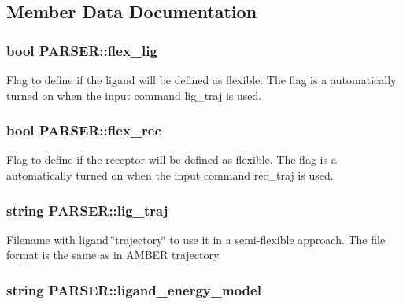 \subsection{Member Data Documentation}
\hypertarget{classPARSER_a974c6bc2d7250503d9dddece25abdb62}{
\subsubsection[{flex\_\-lig}]{\setlength{\rightskip}{0pt plus 5cm}bool {\bf PARSER::flex\_\-lig}}}
\label{classPARSER_a974c6bc2d7250503d9dddece25abdb62}
Flag to define if the ligand will be defined as flexible. The flag is a automatically turned on when the input command lig\_\-traj is used. \hypertarget{classPARSER_a9f3545bfdf2adb743c7cec9b7ebf904b}{
\subsubsection[{flex\_\-rec}]{\setlength{\rightskip}{0pt plus 5cm}bool {\bf PARSER::flex\_\-rec}}}
\label{classPARSER_a9f3545bfdf2adb743c7cec9b7ebf904b}
Flag to define if the receptor will be defined as flexible. The flag is a automatically turned on when the input command rec\_\-traj is used. \hypertarget{classPARSER_a0e2e4608457fc138a5f76dbba8b0ade2}{
\subsubsection[{lig\_\-traj}]{\setlength{\rightskip}{0pt plus 5cm}string {\bf PARSER::lig\_\-traj}}}
\label{classPARSER_a0e2e4608457fc138a5f76dbba8b0ade2}
Filename with ligand \char`\"{}trajectory\char`\"{} to use it in a semi-\/flexible approach. The file format is the same as in AMBER trajectory. \hypertarget{classPARSER_a0a43b6648c3d3178e2a300750e91eee2}{
\subsubsection[{ligand\_\-energy\_\-model}]{\setlength{\rightskip}{0pt plus 5cm}string {\bf PARSER::ligand\_\-energy\_\-model}}}
\label{classPARSER_a0a43b6648c3d3178e2a300750e91eee2}
